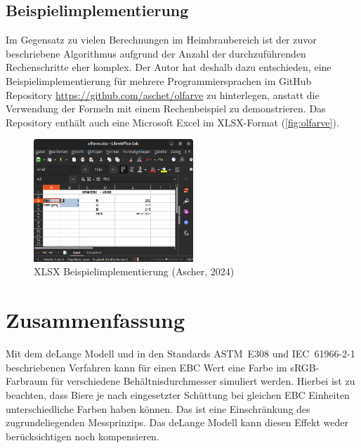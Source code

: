 \documentclass[10pt,a4paper,DIV=12,parskip=half]{scrarticle}
\begin{document}
\subsection*{Beispielimplementierung}

Im Gegensatz zu vielen Berechnungen im Heimbraubereich ist der zuvor beschriebene Algorithmus aufgrund der Anzahl der durchzuführenden Rechenschritte eher komplex. Der Autor hat deshalb dazu entschieden, eine Beispielimplementierung für mehrere Programmiersprachen im GitHub Repository \url{https://github.com/aschet/olfarve} zu hinterlegen, anstatt die Verwendung der Formeln mit einem Rechenbeispiel zu demonstrieren. Das Repository enthält auch eine Microsoft Excel im XLSX-Format (\autoref{fig:olfarve}).

\begin{figure}[H]
	\centering
	\includegraphics[width=6cm]{olfarve.png}
	\caption{XLSX Beispielimplementierung (Ascher, 2024)}
	\label{fig:olfarve}
\end{figure}

\section*{Zusammenfassung}

Mit dem deLange Modell und in den Standards ASTM~E308 und IEC~61966-2-1 beschriebenen Verfahren kann für einen EBC Wert eine Farbe im sRGB-Farbraum für verschiedene Behältnisdurchmesser simuliert werden. Hierbei ist zu beachten, dass Biere je nach eingesetzter Schüttung bei gleichen EBC Einheiten unterschiedliche Farben haben können. Das ist eine Einschränkung des zugrundeliegenden Messprinzips. Das deLange Modell kann diesen Effekt weder berücksichtigen noch kompensieren.

\printbibliography[title=Quellen]
\end{document}
